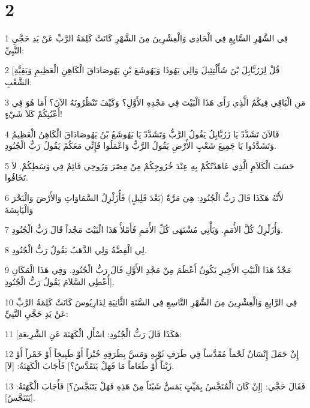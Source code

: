 \chapter{2}

\par 1 فِي الشَّهْرِ السَّابِعِ فِي الْحَادِي وَالْعِشْرِينَ مِنَ الشَّهْرِ كَانَتْ كَلِمَةُ الرَّبِّ عَنْ يَدِ حَجَّيِ النَّبِيِّ:
\par 2 [قُلْ لِزَرُبَّابِلَ بْنَ شَأَلْتِئِيلَ وَالِي يَهُوذَا وَيَهُوشَعَ بْنِ يَهُوصَادَاقَ الْكَاهِنِ الْعَظِيمِ وَبَقِيَّةِ الشَّعْبِ:
\par 3 مَنِ الْبَاقِي فِيكُمُ الَّذِي رَأَى هَذَا الْبَيْتَ فِي مَجْدِهِ الأَوَّلِ؟ وَكَيْفَ تَنْظُرُونَهُ الآنَ؟ أَمَا هُوَ فِي أَعْيُنِكُمْ كَلاَ شَيْءٍ!
\par 4 فَالآنَ تَشَدَّدْ يَا زَرُبَّابِلُ يَقُولُ الرَّبُّ وَتَشَدَّدْ يَا يَهُوشَعُ بْنُ يَهُوصَادَاقَ الْكَاهِنُ الْعَظِيمُ وَتَشَدَّدُوا يَا جَمِيعَ شَعْبِ الأَرْضِ يَقُولُ الرَّبُّ وَاعْمَلُوا فَإِنِّي مَعَكُمْ يَقُولُ رَبُّ الْجُنُودِ.
\par 5 حَسَبَ الْكَلاَمِ الَّذِي عَاهَدْتُكُمْ بِهِ عِنْدَ خُرُوجِكُمْ مِنْ مِصْرَ وَرُوحِي قَائِمٌ فِي وَسَطِكُمْ. لاَ تَخَافُوا.
\par 6 لأَنَّهُ هَكَذَا قَالَ رَبُّ الْجُنُودِ: هِيَ مَرَّةٌ (بَعْدَ قَلِيلٍ) فَأُزَلْزِلُ السَّمَاوَاتِ وَالأَرْضَ وَالْبَحْرَ وَالْيَابِسَةَ
\par 7 وَأُزَلْزِلُ كُلَّ الأُمَمِ. وَيَأْتِي مُشْتَهَى كُلِّ الأُمَمِ فَأَمْلأُ هَذَا الْبَيْتَ مَجْداً قَالَ رَبُّ الْجُنُودِ.
\par 8 لِي الْفِضَّةُ وَلِي الذَّهَبُ يَقُولُ رَبُّ الْجُنُودِ.
\par 9 مَجْدُ هَذَا الْبَيْتِ الأَخِيرِ يَكُونُ أَعْظَمَ مِنْ مَجْدِ الأَوَّلِ قَالَ رَبُّ الْجُنُودِ. وَفِي هَذَا الْمَكَانِ أُعْطِي السَّلاَمَ يَقُولُ رَبُّ الْجُنُودِ].
\par 10 فِي الرَّابِعِ وَالْعِشْرِينَ مِنَ الشَّهْرِ التَّاسِعِ فِي السَّنَةِ الثَّانِيَةِ لِدَارِيُوسَ كَانَتْ كَلِمَةُ الرَّبِّ عَنْ يَدِ حَجَّيِ النَّبِيِّ:
\par 11 [هَكَذَا قَالَ رَبُّ الْجُنُودِ: اسْأَلِ الْكَهَنَةَ عَنِ الشَّرِيعَةِ:
\par 12 إِنْ حَمَلَ إِنْسَانٌ لَحْماً مُقَدَّساً فِي طَرَفِ ثَوْبِهِ وَمَسَّ بِطَرَفِهِ خُبْزاً أَوْ طَبِيخاً أَوْ خَمْراً أَوْ زَيْتاً أَوْ طَعَاماً مَا فَهَلْ يَتَقَدَّسُ؟] فَأَجَابَ الْكَهَنَةُ: [لاَ].
\par 13 فَقَالَ حَجَّي: [إِنْ كَانَ الْمُنَجَّسُ بِمَيِّتٍ يَمَسُّ شَيْئاً مِنْ هَذِهِ فَهَلْ يَتَنَجَّسُ؟] فَأَجَابَ الْكَهَنَةُ: [يَتَنَجَّسُ].
